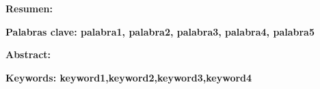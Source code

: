 \newpage
\thispagestyle{empty}
\begin{center}
\large
\centering{\textbf{\thesisTitleSpanish}}
\end{center}

\vspace{.5cm}\small
\textbf{Resumen:}
%
%
\smallskip

\textbf{\footnotesize{Palabras clave: palabra1, palabra2, palabra3, palabra4, palabra5}}

\cleardoublepage{}

\thispagestyle{empty}
\begin{center}
\large
\centering{\textbf{\thesisTitleEnglish}}
\normalsize
\end{center}

\small
\vspace{1cm}
\textbf{Abstract:}
\bigskip

\footnotesize
\textbf{Keywords: keyword1,keyword2,keyword3,keyword4}

\cleardoublepage{}


